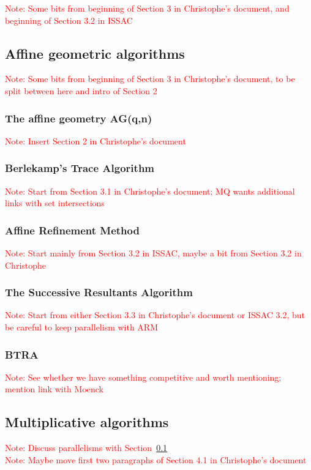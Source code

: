 \documentclass{article}
\newcommand{\qq}{q}
\newcommand{\nn}{n}
\newcounter{algo}
\newcommand{\Notes}[1]{\textcolor{red}{Note: #1}}
\begin{document}
\Notes{Some bits from beginning of Section 3 in Christophe's document, and beginning of Section 3.2 in ISSAC}


\subsection{Affine geometric algorithms}
\label{sec:affine-geom-algor}
\Notes{Some bits from beginning of Section 3 in Christophe's document, to be split between here and  intro of Section 2}

\subsubsection{The affine geometry AG(\qq,\nn)}
\label{sec:affine-geom}
\Notes{Insert Section 2 in Christophe's document}

\subsubsection{Berlekamp's Trace Algorithm}
\label{sec:BTA}
\Notes{Start from Section 3.1 in Christophe's document; MQ wants additional links with set intersections}

\subsubsection{Affine Refinement Method}
\label{sec:ARN}
\Notes{Start mainly from Section 3.2 in ISSAC, maybe a bit from Section 3.2 in Christophe}


\subsubsection{The Successive Resultants Algorithm}
\label{sec:SRA}
\Notes{Start from either Section 3.3 in Christophe's document or ISSAC 3.2, but be careful to keep parallelism with ARM}


\subsubsection{BTRA}
\Notes{See whether we have something competitive and worth mentioning; mention link with Moenck}


\subsection{Multiplicative algorithms}
\label{sec:mult-algor}
\Notes{Discuss parallelisms with Section~\ref{sec:affine-geom-algor}}\\
\noindent\Notes{Maybe move first two paragraphs of Section 4.1 in Christophe's document}
\end{document}
